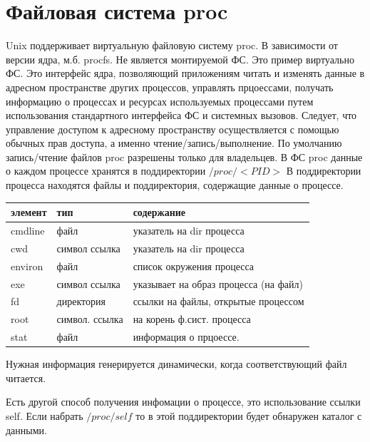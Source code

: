 \section{Файловая система proc}

Unix поддерживает виртуальную файловую систему proc. В зависимости от версии ядра, м.б. procfs. Не является монтируемой ФС. Это пример виртуально ФС. Это интерфейс ядра, позволяющий приложениям читать и изменять данные в адресном пространстве других процессов, управлять прцоессами, получать информацию о процессах и ресурсах используемых процессами путем использования стандартного интерфейса ФС и системных вызовов. Следует, что управление доступом к адресному пространству осуществляется с помощью обычных прав доступа, а именно чтение/запись/выполнение. По умолчанию запись/чтение файлов proc разрешены только для владельцев. В  ФС proc данные о каждом процессе хранятся в поддиректории $/proc/<PID>$
В поддиректории процесса находятся файлы и поддиректория, содержащие данные о процессе. 

\begin{table}[H]
\begin{tabular}{|l|l|l|}
\hline
элемент & тип & содержание \\
\hline
cmdline & файл & указатель на dir процесса \\
cwd & символ ссылка & указатель на dir процесса\\
environ & файл & список окружения процесса\\
exe & символ ссылка & указывает на образ процесса (на файл)\\
fd & директория & ссылки на файлы, открытые процессом\\
root & символ. ссылка & на корень ф.сист. процесса\\
stat & файл & информация о прцоессе.\\
\hline
\end{tabular}
\end{table}

Нужная информация генерируется динамически, когда соответствующий файл читается. 

Есть другой способ получения инфомации о процессе, это использование ссылки self. Если набрать $/proc/self$  то в этой поддиректории будет обнаружен каталог с данными.

 
